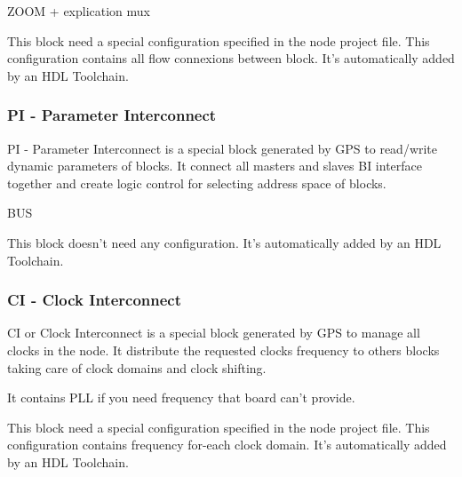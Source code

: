 ZOOM + explication mux

This block need a special configuration specified in the node project file. This configuration contains all flow connexions between block. It's automatically added by an HDL Toolchain.

\subsubsection{PI - Parameter Interconnect}
PI - Parameter Interconnect is a special block generated by GPS to read/write dynamic parameters of blocks. It connect all masters and slaves BI interface together and create logic control for selecting address space of blocks.

BUS

This block doesn't need any configuration. It's automatically added by an HDL Toolchain.

\subsubsection{CI - Clock Interconnect}
CI or Clock Interconnect is a special block generated by GPS to manage all clocks in the node. It distribute the requested clocks frequency to others blocks taking care of clock domains and clock shifting.

It contains PLL if you need frequency that board can't provide.

This block need a special configuration specified in the node project file. This configuration contains frequency for-each clock domain. It's automatically added by an HDL Toolchain.

